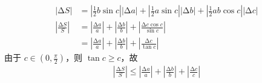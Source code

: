 \documentclass{sjtuarticle}
\begin{document}
\begin{itemize}
\begin{align*}
        \left|\increment S\right| &= \left|\frac{1}{2}b\sin c\right|\left|\increment a\right|+\left|\frac{1}{2}a\sin c \right|\left|\increment b\right| + \left|\frac{1}{2}ab\cos c\right|\left|\increment c\right|\\
        \left|\frac{\increment S}{S}\right| &= \left|\frac{\increment a}{a}\right| + \left|\frac{\increment b}{b}\right| +\left| \frac{\increment c\cos c}{\sin c}\right|\\
         &=\left|\frac{\increment a}{a}\right| + \left|\frac{\increment b}{b}\right| + \left|\frac{\increment c}{\tan c}\right|
    \end{align*}
    由于 $c\in (0,\frac{\pi}{2})$，则 $\tan c \geq c$，故
    \begin{align*}
        \left|\frac{\increment S}{S}\right| \leq \left|\frac{\increment a}{a}\right| + \left|\frac{\increment b}{b}\right| + \left|\frac{\increment c}{c}\right|
    \end{align*}
\end{itemize}
\end{document}
